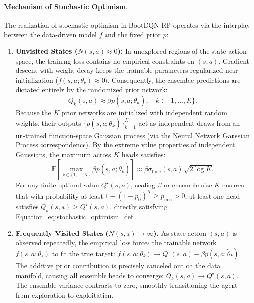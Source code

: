 \documentclass[10pt]{article}
\begin{document}
\paragraph{Mechanism of Stochastic Optimism.}
The realization of stochastic optimism in BootDQN-RP operates via the interplay between the data-driven model $f$ and the fixed prior $p$:
\begin{enumerate}
    \item \textbf{Unvisited States ($N(s, a) \approx 0$):} In unexplored regions of the state-action space, the training loss contains no empirical constraints on $(s, a)$. Gradient descent with weight decay keeps the trainable parameters regularized near initialization ($f(s, a; \theta_k) \approx 0$). Consequently, the ensemble predictions are dictated entirely by the randomized prior network:
    \begin{equation}
    Q_k(s, a) \approx \beta p(s, a; \tilde{\theta}_k), \quad k \in \{1, \dots, K\}.
    \end{equation}
    Because the $K$ prior networks are initialized with independent random weights, their outputs $\{p(s, a; \tilde{\theta}_k)\}_{k=1}^K$ act as independent draws from an un-trained function-space Gaussian process (via the Neural Network Gaussian Process correspondence). By the extreme value properties of independent Gaussians, the maximum across $K$ heads satisfies:
    \begin{equation}
    \mathbb{E}\left[\max_{k \in \{1, \dots, K\}} \beta p(s, a; \tilde{\theta}_k)\right] \approx \beta \sigma_{\text{func}}(s, a) \sqrt{2 \log K}.
    \end{equation}
    For any finite optimal value $Q^\star(s, a)$, scaling $\beta$ or ensemble size $K$ ensures that with probability at least $1 - (1 - p_0)^K \ge p_{\min} > 0$, at least one head satisfies $Q_k(s, a) \ge Q^\star(s, a)$, directly satisfying Equation~\eqref{eq:stochastic_optimism_def}.
    \item \textbf{Frequently Visited States ($N(s, a) \to \infty$):} As state-action $(s, a)$ is observed repeatedly, the empirical loss forces the trainable network $f(s, a; \theta_k)$ to fit the true target: $f(s, a; \theta_k) \to Q^\star(s, a) - \beta p(s, a; \tilde{\theta}_k)$. The additive prior contribution is precisely canceled out on the data manifold, causing all ensemble heads to converge: $Q_k(s, a) \to Q^\star(s, a)$. The ensemble variance contracts to zero, smoothly transitioning the agent from exploration to exploitation.
\end{enumerate}
\end{document}
